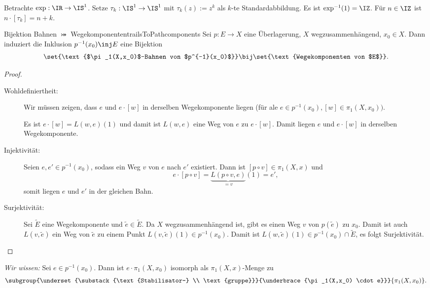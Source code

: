 \documentclass[language=ngerman]{TemplateLecture} %
\begin{document}
\begin{example}
    Betrachte $\exp: \IR \to \IS^1$. Setze $\tau_k: \IS^1 \to \IS^1$ mit $\tau_k(z) := z^k$ als $k$-te Standardabbildung. Es ist $\exp^{-1}(1) = \IZ$. Für $n \in \IZ$ ist $n \cdot [\tau_k] = n + k$.
\end{example}

\begin{thm}{Bijektion Bahnen $\bij$ Wegekomponenten}{trailsToPathcomponents}
    Sei $p: E \to X$ eine Überlagerung, $X$ wegzusammenhängend, $x_0 \in X$. Dann induziert die Inklusion $p^{-1}(x_0) \inj E$ eine Bijektion 
    \begin{equation*}
        \set{\text{$\pi_1(X,x_0)$-Bahnen von $p^{-1}(x_0)$}} \bij \set{\text{Wegekomponenten von $E$}}.
    \end{equation*}
\end{thm}

\begin{proof}
    \begin{description}
        \item[Wohldefiniertheit:] Wir müssen zeigen, dass $e$ und $e \cdot [w]$ in derselben Wegekomponente liegen (für ale $e \in p^{-1}(x_0), [w] \in \pi_1(X,x_0))$.
        
        Es ist $e \cdot [w] = L(w,e)(1)$ und damit ist $L(w,e)$ eine Weg von $e$ zu $e \cdot [w]$. Damit liegen $e$ und $e \cdot [w]$ in derselben Wegekomponente.

        \item[Injektivität:] Seien $e, e' \in p^{-1}(x_0)$, sodass ein Weg $v$ von $e$ nach $e'$ existiert. Dann ist $[p \circ v] \in \pi_1(X,x)$ und
        \begin{equation*}
            e \cdot [p \circ v] = \underset{=v}{\underbrace{L(p \circ v, e)}}(1) = e',
        \end{equation*}
        somit liegen $e$ und $e'$ in der gleichen Bahn.

        \item[Surjektivität:] Sei $\tilde{E}$ eine Wegekomponente und $\tilde{e} \in \tilde{E}$. Da $X$ wegzusammenhängend ist, gibt es einen Weg $v$ von $p(\tilde{e})$ zu $x_0$. Damit ist auch $L(v,\tilde{e})$ ein Weg von $\tilde{e}$ zu einem Punkt $L(v,\tilde{e})(1) \in p^{-1}(x_0)$. Damit ist $L(w,\tilde{e})(1) \in p^{-1}(x_0) \cap \tilde{E}$, es folgt Surjektivität.
    \end{description}
\end{proof}

\emph{Wir wissen:} Sei $e \in p^{-1}(x_0)$. Dann ist $e \cdot \pi_1(X,x_0)$ isomorph als $\pi_1(X,x)$-Menge zu 
\begin{equation*}
    \subgroup{\underset{\substack{\text{Stabilisator-} \\ \text{gruppe}}}{\underbrace{\pi_1(X,x_0) \cdot e}}}{\pi_1(X,x_0)}.
\end{equation*}
\end{document}
